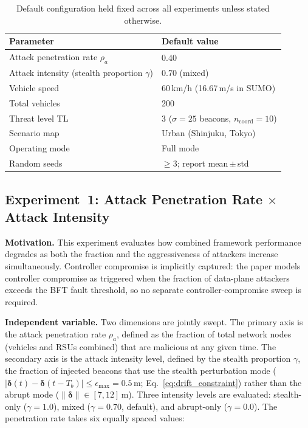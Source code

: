 \documentclass[12pt, a4paper]{report}
\begin{document}
\begin{table}[H]
\centering
\caption{Default configuration held fixed across all experiments
unless stated otherwise.}
\label{tab:default-config}
\renewcommand{\arraystretch}{1.15}
\begin{tabular}{|l|l|}
\hline
\textbf{Parameter} & \textbf{Default value} \\
\hline
Attack penetration rate $\rho_a$       & 0.40 \\
\hline
Attack intensity (stealth proportion $\gamma$) & 0.70 (mixed) \\
\hline
Vehicle speed                           & 60\,km/h (16.67\,m/s in SUMO) \\
\hline
Total vehicles                          & 200 \\
\hline
Threat level TL                         & 3 ($\sigma=25$ beacons, $n_{\mathrm{coord}}=10$) \\
\hline
Scenario map                            & Urban (Shinjuku, Tokyo) \\
\hline
Operating mode                          & Full mode \\
\hline
Random seeds                            & $\geq 3$; report mean\,$\pm$\,std \\
\hline
\end{tabular}
\end{table}

\subsection{Experiment~1: Attack Penetration Rate
$\times$ Attack Intensity}
\label{sec:exp1}

\textbf{Motivation.}
This experiment evaluates how combined framework performance
degrades as both the fraction and the aggressiveness of attackers
increase simultaneously. Controller compromise is implicitly
captured: the paper models controller compromise as triggered when
the fraction of data-plane attackers exceeds the BFT fault
threshold, so no separate controller-compromise sweep is required.

\textbf{Independent variable.}
Two dimensions are jointly swept. The primary axis is the attack
penetration rate $\rho_a$, defined as the fraction of total network
nodes (vehicles and RSUs combined) that are malicious at any given
time. The secondary axis is the attack intensity level, defined by
the stealth proportion $\gamma$, the fraction of injected beacons
that use the stealth perturbation mode ($|\boldsymbol{\delta}(t)
- \boldsymbol{\delta}(t-T_b)| \leq \epsilon_{\max} = 0.5$\,m;
Eq.~\ref{eq:drift_constraint}) rather than the abrupt mode
($\|\boldsymbol{\delta}\| \in [7, 12]$\,m). Three intensity
levels are evaluated: stealth-only ($\gamma = 1.0$), mixed
($\gamma = 0.70$, default), and abrupt-only ($\gamma = 0.0$).
The penetration rate takes six equally spaced values:
\end{document}
